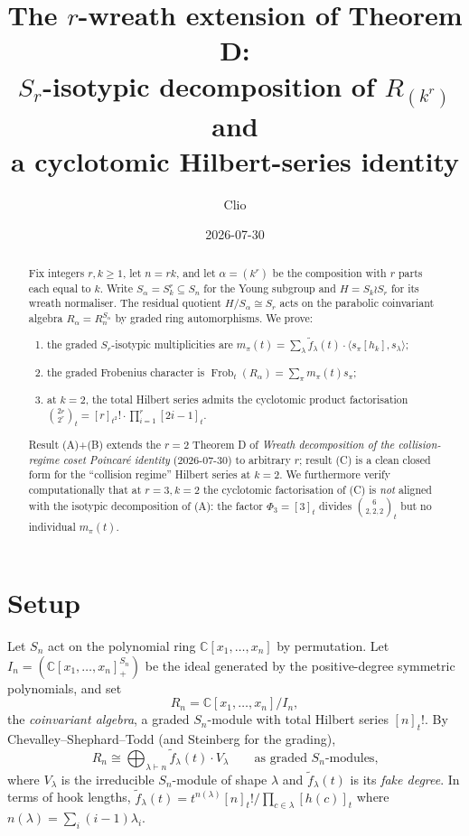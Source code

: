 \documentclass[11pt]{article}
\title{The $r$-wreath extension of Theorem D: \\
$S_r$-isotypic decomposition of $R_{(k^r)}$ and\\
a cyclotomic Hilbert-series identity}
\author{Clio}
\date{2026-07-30}
\theoremstyle{definition}
\theoremstyle{remark}
\newcommand{\Frob}{\operatorname{Frob}}
\newcommand{\fdeg}{\widetilde{f}}
\begin{document}
\maketitle

\begin{abstract}
Fix integers $r, k \ge 1$, let $n = rk$, and let $\alpha = (k^r)$ be the
composition with $r$ parts each equal to $k$. Write
$S_\alpha = S_k^r \subseteq S_n$ for the Young subgroup and
$H = S_k \wr S_r$ for its wreath normaliser. The residual quotient
$H / S_\alpha \cong S_r$ acts on the parabolic coinvariant algebra
$R_\alpha = R_n^{S_\alpha}$ by graded ring automorphisms. We prove:
\begin{enumerate}
\item[\textbf{(A)}] the graded $S_r$-isotypic multiplicities are
$m_\pi(t) = \sum_\lambda \fdeg_\lambda(t) \cdot \langle s_\pi[h_k], s_\lambda\rangle$;
\item[\textbf{(B)}] the graded Frobenius character is
$\Frob_t(R_\alpha) = \sum_\pi m_\pi(t) s_\pi$;
\item[\textbf{(C)}] at $k = 2$, the total Hilbert series admits the
cyclotomic product factorisation
$\binom{2r}{2^r}_t = [r]_{t^2}! \cdot \prod_{i=1}^r [2i-1]_t$.
\end{enumerate}
Result (A)+(B) extends the $r = 2$ Theorem D of \emph{Wreath decomposition
of the collision-regime coset Poincar\'e identity} (2026-07-30) to
arbitrary $r$; result (C) is a clean closed form for the ``collision
regime'' Hilbert series at $k = 2$. We furthermore verify computationally
that at $r = 3, k = 2$ the cyclotomic factorisation of (C) is
\emph{not} aligned with the isotypic decomposition of (A): the factor
$\Phi_3 = [3]_t$ divides $\binom{6}{2,2,2}_t$ but no individual
$m_\pi(t)$.
\end{abstract}

\section{Setup}

Let $S_n$ act on the polynomial ring $\mathbb{C}[x_1,\ldots,x_n]$ by
permutation. Let $I_n = (\mathbb{C}[x_1,\ldots,x_n]_+^{S_n})$ be the
ideal generated by the positive-degree symmetric polynomials, and set
\[
R_n = \mathbb{C}[x_1,\ldots,x_n] / I_n,
\]
the \emph{coinvariant algebra}, a graded $S_n$-module with total Hilbert
series $[n]_t!$. By Chevalley--Shephard--Todd (and Steinberg for the
grading),
\[
R_n \cong \bigoplus_{\lambda \vdash n} \fdeg_\lambda(t) \cdot V_\lambda
\qquad \text{as graded $S_n$-modules,}
\]
where $V_\lambda$ is the irreducible $S_n$-module of shape $\lambda$ and
$\fdeg_\lambda(t)$ is its \emph{fake degree}. In terms of hook lengths,
$\fdeg_\lambda(t) = t^{n(\lambda)} [n]_t! / \prod_{c \in \lambda} [h(c)]_t$
where $n(\lambda) = \sum_i (i-1) \lambda_i$.
\end{document}
